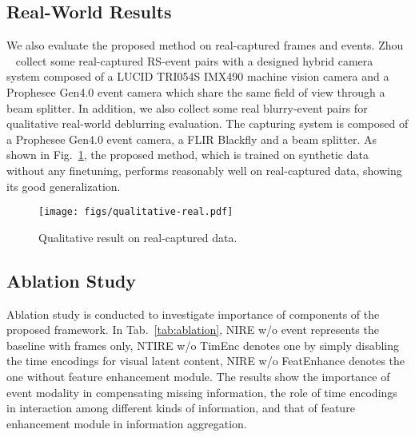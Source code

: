 \documentclass[10pt,twocolumn,letterpaper]{article}
\begin{document}
\subsection{Real-World Results}
We also evaluate the proposed method on real-captured frames and events. 
Zhou \etal~\cite{EvUnroll} collect some real-captured RS-event pairs with a designed hybrid camera system composed of a LUCID TRI054S IMX490 machine vision camera and a Prophesee Gen4.0 event camera which share the same field of view through a beam splitter.
In addition, we also collect some real blurry-event pairs for qualitative real-world deblurring evaluation. The capturing system is composed of a  Prophesee Gen4.0 event camera, a FLIR Blackfly and a beam splitter.
As shown in Fig.~\ref{fig:qualitative-real}, the proposed method, which is trained on synthetic data without any finetuning, performs reasonably well on real-captured data, showing its good generalization.
\begin{figure}[h!]
	\centering
	\texttt{[image: figs/qualitative-real.pdf]}
	\caption{Qualitative result on real-captured data. }
	\label{fig:qualitative-real}
\end{figure}

\subsection{Ablation Study}
Ablation study is conducted to investigate importance of components of the proposed framework.
In Tab.~\ref{tab:ablation}, NIRE w/o event represents the baseline with frames only, NTIRE w/o TimEnc denotes one by simply disabling the time encodings for visual latent content, NIRE w/o FeatEnhance denotes the one without feature enhancement module.
The results show the importance of event modality in compensating missing information, the role of time encodings in interaction among different kinds of information, and that of feature enhancement module in information aggregation.

\begin{table}[h!]
\caption{Ablation study of NIRE (in PSNR/SSIM).}
\label{tab:ablation}
\end{table}
\end{document}
